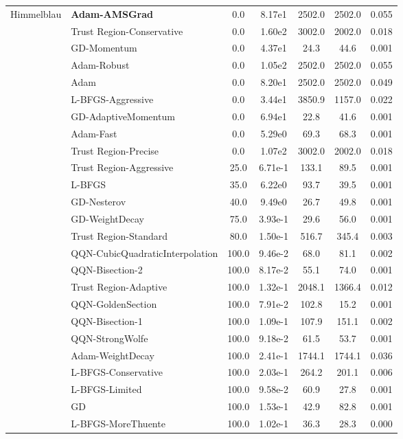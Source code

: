 \documentclass{article}
\begin{document}
\begin{table}[htbp]
{\begin{tabular}{p{2.5cm}p{2.5cm}*{5}{c}}
\midrule
\multirow{25}{*}{Himmelblau} & \textbf{Adam-AMSGrad} & 0.0 & 8.17e1 & 2502.0 & 2502.0 & 0.055 \\
 & Trust Region-Conservative & 0.0 & 1.60e2 & 3002.0 & 2002.0 & 0.018 \\
 & GD-Momentum & 0.0 & 4.37e1 & 24.3 & 44.6 & 0.001 \\
 & Adam-Robust & 0.0 & 1.05e2 & 2502.0 & 2502.0 & 0.055 \\
 & Adam & 0.0 & 8.20e1 & 2502.0 & 2502.0 & 0.049 \\
 & L-BFGS-Aggressive & 0.0 & 3.44e1 & 3850.9 & 1157.0 & 0.022 \\
 & GD-AdaptiveMomentum & 0.0 & 6.94e1 & 22.8 & 41.6 & 0.001 \\
 & Adam-Fast & 0.0 & 5.29e0 & 69.3 & 68.3 & 0.001 \\
 & Trust Region-Precise & 0.0 & 1.07e2 & 3002.0 & 2002.0 & 0.018 \\
 & Trust Region-Aggressive & 25.0 & 6.71e-1 & 133.1 & 89.5 & 0.001 \\
 & L-BFGS & 35.0 & 6.22e0 & 93.7 & 39.5 & 0.001 \\
 & GD-Nesterov & 40.0 & 9.49e0 & 26.7 & 49.8 & 0.001 \\
 & GD-WeightDecay & 75.0 & 3.93e-1 & 29.6 & 56.0 & 0.001 \\
 & Trust Region-Standard & 80.0 & 1.50e-1 & 516.7 & 345.4 & 0.003 \\
 & QQN-CubicQuadraticInterpolation & 100.0 & 9.46e-2 & 68.0 & 81.1 & 0.002 \\
 & QQN-Bisection-2 & 100.0 & 8.17e-2 & 55.1 & 74.0 & 0.001 \\
 & Trust Region-Adaptive & 100.0 & 1.32e-1 & 2048.1 & 1366.4 & 0.012 \\
 & QQN-GoldenSection & 100.0 & 7.91e-2 & 102.8 & 15.2 & 0.001 \\
 & QQN-Bisection-1 & 100.0 & 1.09e-1 & 107.9 & 151.1 & 0.002 \\
 & QQN-StrongWolfe & 100.0 & 9.18e-2 & 61.5 & 53.7 & 0.001 \\
 & Adam-WeightDecay & 100.0 & 2.41e-1 & 1744.1 & 1744.1 & 0.036 \\
 & L-BFGS-Conservative & 100.0 & 2.03e-1 & 264.2 & 201.1 & 0.006 \\
 & L-BFGS-Limited & 100.0 & 9.58e-2 & 60.9 & 27.8 & 0.001 \\
 & GD & 100.0 & 1.53e-1 & 42.9 & 82.8 & 0.001 \\
 & L-BFGS-MoreThuente & 100.0 & 1.02e-1 & 36.3 & 28.3 & 0.000 \\

\end{tabular}}
\end{table}
\end{document}
